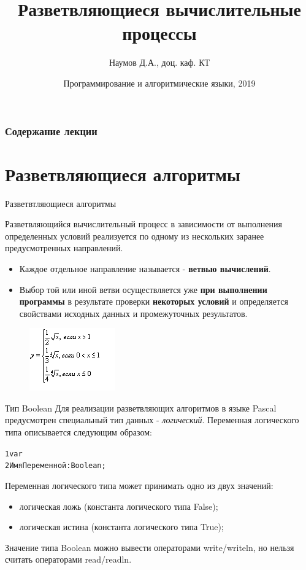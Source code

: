 \documentclass{beamer}
\title[Основы языка Pascal]{Разветвляющиеся вычислительные процессы}
\author{Наумов Д.А., доц. каф. КТ}
\date[03.10.2019] {Программирование и алгоритмические языки, 2019}
\begin{document}
\begin{frame}
  \titlepage
\end{frame}
  
\begin{frame}
  \frametitle{Содержание лекции}
  \tableofcontents  
\end{frame}

\section{Разветвляющиеся алгоритмы}

\begin{frame}{Разветвтляющиеся алгоритмы}
\begin{block}{Разветвляющийся вычислительный процесс}
в зависимости от выполнения определенных условий реализуется по одному из нескольких заранее предусмотренных направлений. 
\end{block}
\begin{itemize}
\item Каждое отдельное направление называется - \textbf{ветвью вычислений}. 
\item Выбор той или иной ветви осуществляется уже \textbf{при выполнении программы }в результате проверки \textbf{некоторых условий }и определяется свойствами исходных данных и промежуточных результатов. 
\end{itemize}
\begin{figure}[h]
\centering
\includegraphics[scale=1]{images/lec03-pic01.png}
\end{figure}
\end{frame} 

\begin{frame}[fragile]{Тип Boolean}
Для реализации разветвляющих алгоритмов в языке Pascal предусмотрен специальный тип данных - \emph{логический}. 
Переменная логического типа описывается следующим образом: 
\begin{alltt}
1 var
2   ИмяПеременной: Boolean; 
\end{alltt}
Переменная логического типа может принимать одно из двух значений: 
\begin{itemize}
\item логическая ложь (константа логического типа False);
\item логическая истина (константа логического типа True);
\end{itemize}
Значение типа Boolean можно вывести операторами write/writeln, но нельзя считать операторами read/readln.
\end{frame}
\end{document}
